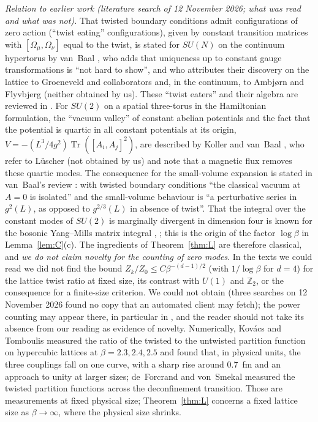 \documentclass[11pt,a4paper]{article}
\theoremstyle{plain}
\theoremstyle{definition}
\theoremstyle{remark}
\numberwithin{equation}{section}
\newcommand{\Z}{\mathbb{Z}}
\newcommand{\Tr}{\operatorname{Tr}}
\begin{document}
\emph{Relation to earlier work (literature search of 12 November 2026; what was read and what was not).} That twisted boundary conditions admit configurations of zero action (``twist eating'' configurations), given by constant transition matrices with $[\Omega_\mu,\Omega_\nu]$ equal to the twist, is stated for $SU(N)$ on the continuum hypertorus by van~Baal \cite[Thm~4.1 and the lines that follow it]{vB82}, who adds that uniqueness up to constant gauge transformations is ``not hard to show'', and who attributes their discovery on the lattice to Groeneveld and collaborators \cite{GJK81} and, in the continuum, to Ambj{\o}rn and Flyvbjerg \cite{AF80} (neither obtained by us). These ``twist eaters'' and their algebra are reviewed in \cite[Sections~4.2--4.3 and 8.1]{GA98}. For $SU(2)$ on a spatial three-torus in the Hamiltonian formulation, the ``vacuum valley'' of constant abelian potentials and the fact that the potential is quartic in all constant potentials at its origin, $V=-(L^3/4g^2)\Tr([A_i,A_j]^2)$, are described by Koller and van~Baal \cite[Section~1]{KvB86}, who refer to L\"uscher \cite{Lu83} (not obtained by us) and note that a magnetic flux removes these quartic modes. The consequence for the small-volume expansion is stated in van~Baal's review \cite[Section~3.4]{vB00}: with twisted boundary conditions ``the classical vacuum at $A=0$ is isolated'' and the small-volume behaviour is ``a perturbative series in $g^2(L)$, as opposed to $g^{2/3}(L)$ in absence of twist''. That the integral over the constant modes of $SU(2)$ is marginally divergent in dimension four is known for the bosonic Yang--Mills matrix integral \cite{KS98}, \cite[eq.~(2.37)]{AW01}; this is the origin of the factor $\log\beta$ in Lemma~\ref{lem:C}(c). The ingredients of Theorem~\ref{thm:L} are therefore classical, and \emph{we do not claim novelty for the counting of zero modes}. In the texts we could read we did not find the bound $Z_k/Z_0\le C\beta^{-(d-1)/2}$ (with $1/\log\beta$ for $d=4$) for the lattice twist ratio at fixed size, its contrast with $U(1)$ and $\Z_2$, or the consequence for a finite-size criterion. We could not obtain \cite{tH79,AF80,GJK81,GAO83,Lu83,CGJK85} (three searches on 12 November 2026 found no copy that an automated client may fetch); the power counting may appear there, in particular in \cite{GJK81,CGJK85}, and the reader should not take its absence from our reading as evidence of novelty. Numerically, Kov\'acs and Tomboulis \cite{KT00} measured the ratio of the twisted to the untwisted partition function on hypercubic lattices at $\beta=2.3,2.4,2.5$ and found that, in physical units, the three couplings fall on one curve, with a sharp rise around $0.7$~fm and an approach to unity at larger sizes; de~Forcrand and von~Smekal \cite{dFvS02} measured the twisted partition functions across the deconfinement transition. Those are measurements at fixed physical size; Theorem~\ref{thm:L} concerns a fixed lattice size as $\beta\to\infty$, where the physical size shrinks.
\end{document}
